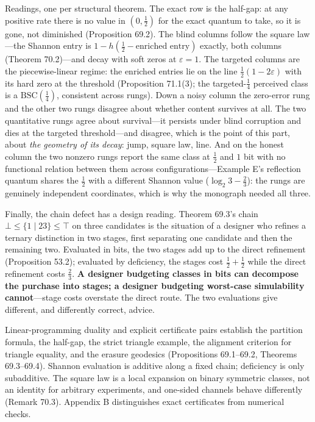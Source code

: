 Readings, one per structural theorem. The exact row is the half-gap: at any positive rate there is no value in \((0, \tfrac12)\) for the exact quantum to take, so it is gone, not diminished (Proposition 69.2). The blind columns follow the square law---\hspace{0pt}the Shannon entry is \(1 - h(\tfrac12 - \text{enriched entry})\) exactly, both columns (Theorem 70.2)---\hspace{0pt}and decay with soft zeros at \(\varepsilon = 1\). The targeted columns are the piecewise-linear regime: the enriched entries lie on the line \(\tfrac12(1 - 2\varepsilon)\) with its hard zero at the threshold (Proposition 71.1(3); the targeted-\(\tfrac14\) perceived class is a \(\mathrm{BSC}(\tfrac14)\), consistent across rungs). Down a noisy column the zero-error rung and the other two rungs disagree about whether content survives at all. The two quantitative rungs agree about survival---\hspace{0pt}it persists under blind corruption and dies at the targeted threshold---\hspace{0pt}and disagree, which is the point of this part, about \emph{the geometry of its decay}: jump, square law, line. And on the honest column the two nonzero rungs report the same class at \(\tfrac12\) and \(1\) bit with no functional relation between them across configurations---\hspace{0pt}Example E's reflection quantum shares the \(\tfrac12\) with a different Shannon value (\(\log_2 3 - \tfrac23\)): the rungs are genuinely independent coordinates, which is why the monograph needed all three.

Finally, the chain defect has a design reading. Theorem 69.3's chain \(\bot \le \{1 \mid 23\} \le \top\) on three candidates is the situation of a designer who refines a ternary distinction in two stages, first separating one candidate and then the remaining two. Evaluated in bits, the two stages add up to the direct refinement (Proposition 53.2); evaluated by deficiency, the stages cost \(\tfrac12 + \tfrac12\) while the direct refinement costs \(\tfrac23\). \textbf{A designer budgeting classes in bits can decompose the purchase into stages; a designer budgeting worst-case simulability cannot}---\hspace{0pt}stage costs overstate the direct route. The two evaluations give different, and differently correct, advice.


Linear-programming duality and explicit certificate pairs establish the partition formula, the half-gap, the strict triangle example, the alignment criterion for triangle equality, and the erasure geodesics (Propositions 69.1--69.2, Theorems 69.3--69.4). Shannon evaluation is additive along a fixed chain; deficiency is only subadditive. The square law is a local expansion on binary symmetric classes, not an identity for arbitrary experiments, and one-sided channels behave differently (Remark 70.3). Appendix B distinguishes exact certificates from numerical checks.
